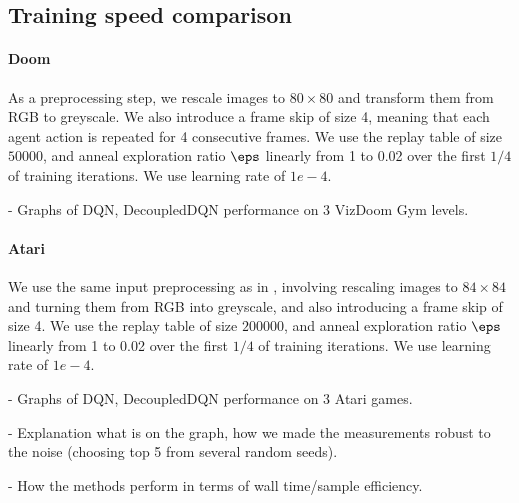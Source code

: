 \subsection{Training speed comparison}

\paragraph{Doom}
As a preprocessing step, we rescale images to $80 \times 80$ and transform them from RGB to greyscale.
We also introduce a frame skip of size 4, meaning that each agent action is repeated for 4 consecutive frames.
We use the replay table of size $50000$, and anneal exploration ratio $\eps$ linearly from 1 to 0.02
over the first $1/4$ of training iterations. We use learning rate of $1e-4$.

- Graphs of DQN, DecoupledDQN performance on 3 VizDoom Gym levels.

\paragraph{Atari}
We use the same input preprocessing as in \cite{NatureDQN}, involving rescaling images to $84
\times 84$ and turning them from RGB into greyscale, and also introducing a frame skip of size 4.
We use the replay table of size $200000$, and anneal exploration ratio $\eps$ linearly from 1 to 0.02
over the first $1/4$ of training iterations. We use learning rate of $1e-4$.

- Graphs of DQN, DecoupledDQN performance on 3 Atari games.

- Explanation what is on the graph, how we made the measurements robust to the noise (choosing top 5
from several random seeds).

- How the methods perform in terms of wall time/sample efficiency.
